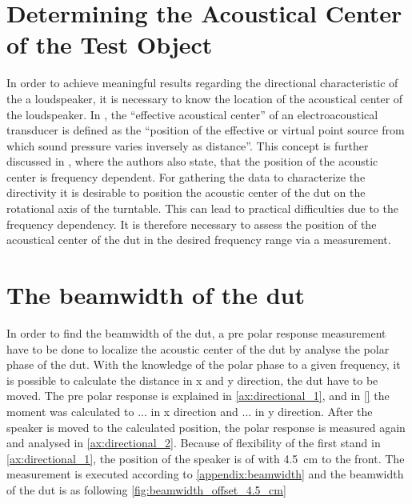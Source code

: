 \section{Determining the Acoustical Center of the Test Object}\label{sec:ac_center}
In order to achieve meaningful results regarding the directional characteristic of the a loudspeaker, it is necessary to know the location of the  acoustical center of the loudspeaker.
In \citep{ansis1.1}, the ``effective acoustical center'' of an electroacoustical transducer is defined as the ``position of the effective or virtual point source from which sound pressure varies inversely as distance''. This concept is further discussed in \citep{jacobsenetal}, where the authors also state, that the position of the acoustic center is frequency dependent. For gathering the data to characterize the directivity it is desirable to position the acoustic center of the \gls{dut} on the rotational axis of the turntable. This can lead to practical difficulties due to the frequency dependency. It is therefore necessary to assess the position of the acoustical center of the \gls{dut} in the desired frequency range via a measurement.







\section{The beamwidth of the \gls{dut}}\label{sec:ac_center}
In order to find the beamwidth of the \gls{dut}, a pre polar response measurement have to be done to localize the acoustic center of the \gls{dut} by analyse the polar phase of the \gls{dut}. With the knowledge of the polar phase to a given frequency, it is possible to calculate the distance in x and y direction, the \gls{dut} have to be moved. The pre polar response is explained in \autoref{ax:directional_1}, and in \autoref{} the moment was calculated to ... in x direction and ... in y direction. 
After the speaker is moved to the calculated position, the polar response is measured again and analysed in \autoref{ax:directional_2}. Because of flexibility of the first stand in \autoref{ax:directional_1}, the position of the speaker is of with \SI{4.5}{\centi\meter} to the front. The measurement  is executed according to \autoref{appendix:beamwidth} and the beamwidth of the \gls{dut} is as following \autoref{fig:beamwidth_offset_4.5_cm} 

